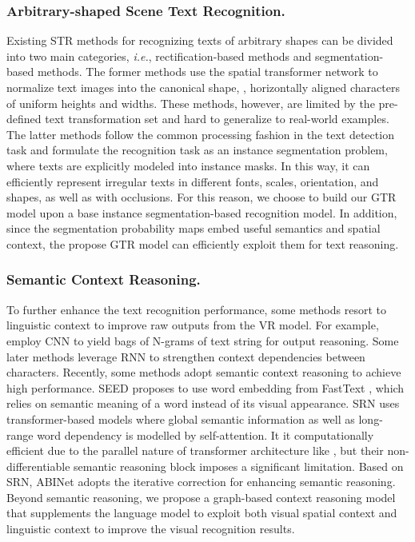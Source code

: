 \documentclass[letterpaper]{article} \usepackage{aaai22}  \usepackage{times}  \usepackage{helvet}  \usepackage{courier}  \usepackage[hyphens]{url}  \usepackage{graphicx} \urlstyle{rm} \def\UrlFont{\rm}  \usepackage{natbib}  \usepackage{caption} \DeclareCaptionStyle{ruled}{labelfont=normalfont,labelsep=colon,strut=off} \frenchspacing  \setlength{\pdfpagewidth}{8.5in}  \setlength{\pdfpageheight}{11in}
\newcommand{\bt}{\color{black}}
\begin{document}
\subsubsection{Arbitrary-shaped Scene Text Recognition.} 
Existing STR methods for recognizing texts of arbitrary shapes can be divided into two main categories, \textit{i.e.}, rectification-based methods and segmentation-based methods. The former methods \cite{gao2018recurrent, yang2017learning, cheng2018aon} use the spatial transformer network \cite{jaderberg2015spatial} to normalize text images into the canonical shape, , horizontally aligned characters of uniform heights and widths. These methods, however, are limited by the pre-defined text transformation set and hard to generalize to real-world examples. The latter methods \cite{liao2019scene,wan2020textscanner} {\bt follow the common processing fashion in the text detection task \cite{ye2021i3cl} and } formulate the recognition task as an instance segmentation problem, where texts are explicitly modeled into instance masks. In this way, it can efficiently represent irregular texts in different fonts, scales, orientation, and shapes, as well as with occlusions. For this reason, we choose to build our GTR model upon a base instance segmentation-based recognition model. In addition, since the segmentation probability maps embed useful semantics and spatial context, the propose GTR model can efficiently exploit them for text reasoning.



\subsubsection{Semantic Context Reasoning.}
To further enhance the text recognition performance, some methods resort to linguistic context to improve raw outputs from the VR model. For example, \cite{cheng2017focusing}
employ {\bt CNN} to yield bags of N-grams of text string for output reasoning. 
Some later methods \cite{Wang2020DecoupledAN,wojna2017attention} leverage {\bt RNN} to strengthen context dependencies between characters.
Recently, some methods adopt semantic context reasoning to achieve high performance. SEED \cite{qiao2020seed} proposes to use word embedding from FastText \cite{bojanowski2017enriching}, which relies on semantic meaning of a word instead of its visual appearance.
SRN \cite{yu2020towards} uses transformer-based models where global semantic information as well as long-range word dependency is modelled by self-attention. It it computationally efficient due to the parallel nature of transformer architecture {\bt like \cite{xu2021vitae}}, but their non-differentiable semantic reasoning block imposes a significant limitation. 
{\bt Based on SRN, ABINet \cite{fang2021read} adopts the iterative correction for enhancing semantic reasoning.}  
Beyond semantic reasoning, we propose a graph-based context reasoning model that supplements the language model to exploit both visual spatial context and linguistic context to improve the visual recognition results.
\end{document}
